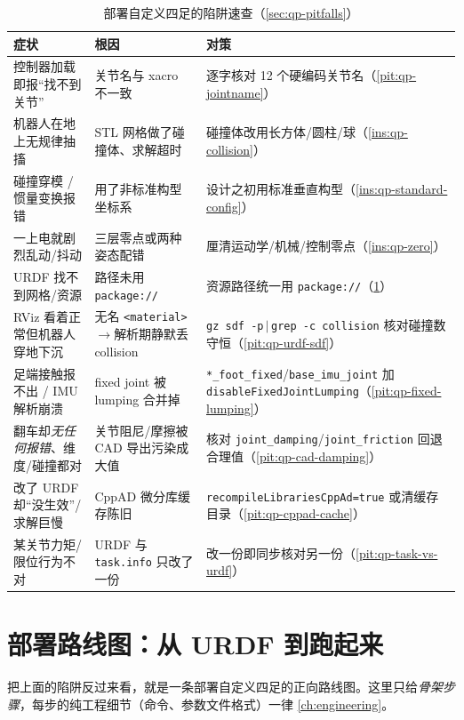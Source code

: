 \begin{table}[H]\centering\small
\caption{部署自定义四足的陷阱速查（\cref{sec:qp-pitfalls}）}
\begin{tabular}{p{} p{} p{}}
\toprule
症状 & 根因 & 对策 \\
\midrule
控制器加载即报“找不到关节” & 关节名与 xacro 不一致 & 逐字核对 12 个硬编码关节名（\cref{pit:qp-jointname}）\\
机器人在地上无规律抽搐 & STL 网格做了碰撞体、求解超时 & 碰撞体改用长方体/圆柱/球（\cref{ins:qp-collision}）\\
碰撞穿模 / 惯量变换报错 & 用了非标准构型坐标系 & 设计之初用标准垂直构型（\cref{ins:qp-standard-config}）\\
一上电就剧烈乱动/抖动 & 三层零点或两种姿态配错 & 厘清运动学/机械/控制零点（\cref{ins:qp-zero}）\\
URDF 找不到网格/资源 & 路径未用 \texttt{package://} & 资源路径统一用 \texttt{package://}（\cref{sec:qp-deploy}）\\
RViz 看着正常但机器人穿地下沉 & 无名 \texttt{<material>}$\to$解析期静默丢 collision & \texttt{gz sdf -p}$\,|\,$\texttt{grep -c collision} 核对碰撞数守恒（\cref{pit:qp-urdf-sdf}）\\
足端接触报不出 / IMU 解析崩溃 & fixed joint 被 lumping 合并掉 & \texttt{*\_foot\_fixed}/\allowbreak\texttt{base\_imu\_joint} 加 \texttt{disableFixedJointLumping}（\cref{pit:qp-fixed-lumping}）\\
翻车却\emph{无任何报错}、维度/碰撞都对 & 关节阻尼/摩擦被 CAD 导出污染成大值 & 核对 \texttt{joint\_damping}/\allowbreak\texttt{joint\_friction} 回退合理值（\cref{pit:qp-cad-damping}）\\
改了 URDF 却“没生效”/求解巨慢 & CppAD 微分库缓存陈旧 & \texttt{recompileLibrariesCppAd=true} 或清缓存目录（\cref{pit:qp-cppad-cache}）\\
某关节力矩/限位行为不对 & URDF 与 \texttt{task.info} 只改了一份 & 改一份即同步核对另一份（\cref{pit:qp-task-vs-urdf}）\\
\bottomrule
\end{tabular}
\label{tab:qp-pitfalls}
\end{table}

\section{部署路线图：从 URDF 到跑起来}
\label{sec:qp-deploy}

把上面的陷阱反过来看，就是一条部署自定义四足的正向路线图。这里只给\emph{骨架步骤}，每步的纯工程细节（命令、参数文件格式）一律 \cref{ch:engineering}。

